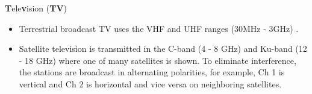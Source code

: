 {\Large {\bfseries T}ele{\bfseries v}ision ({\bfseries TV})}
{
\begin{itemize}

\item Terrestrial broadcast TV uses the VHF and UHF ranges (30MHz - 3GHz)  \hspace{.1in}.

\item Satellite television is transmitted in the C-band (4 - 8 GHz)
\hspace{.1in} and Ku-band (12 - 18 GHz)  \hspace{.08in} where one of many satellites is shown. To eliminate interference, the stations are broadcast in alternating polarities, for example, Ch 1 is vertical and Ch 2 is horizontal and vice versa on neighboring satellites.


\end{itemize}}

